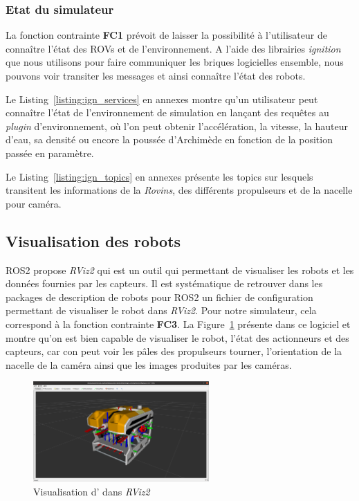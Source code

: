 		\subsubsection{Etat du simulateur}

			La fonction contrainte \textbf{FC1} prévoit de laisser la possibilité à l'utilisateur de connaître l'état des \gls{ROV}s et de l'environnement. A l'aide des librairies \textit{ignition} que nous utilisons pour faire communiquer les briques logicielles ensemble, nous pouvons voir transiter les messages et ainsi connaître l'état des robots.

			Le Listing~\ref{listing:ign_services} en annexes montre qu'un utilisateur peut connaître l'état de l'environnement de simulation en lançant des requêtes au \textit{plugin} d'environnement, où l'on peut obtenir l'accélération, la vitesse, la hauteur d'eau, sa densité ou encore la poussée d'Archimède en fonction de la position passée en paramètre.
			
			Le Listing~\ref{listing:ign_topics} en annexes présente les topics sur lesquels transitent les informations de la \textit{Rovins}, des différents propulseurs et de la nacelle pour caméra.

		\subsection{Visualisation des robots}

			\gls{ROS2} propose \textit{RViz2} qui est un outil qui permettant de visualiser les robots et les données fournies par les capteurs. Il est systématique de retrouver dans les packages de description de robots pour \gls{ROS2} un fichier de configuration permettant de visualiser le robot dans \textit{RViz2}. Pour notre simulateur, cela correspond à la fonction contrainte \textbf{FC3}. La Figure~\ref{fig:argos_rviz} présente \argos{} dans ce logiciel et montre qu'on est bien capable de visualiser le robot, l'état des actionneurs et des capteurs, car con peut voir les pâles des propulseurs tourner, l'orientation de la nacelle de la caméra ainsi que les images produites par les caméras.

			\begin{figure}[!htb]
				\centering
				\includegraphics[width=0.6\textwidth]{imgs/argos_rviz.png}
				\caption{Visualisation d'\argos{} dans \textit{RViz2}}
				\label{fig:argos_rviz}
			\end{figure}

